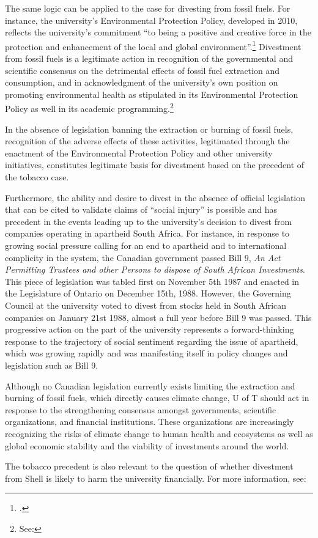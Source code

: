 The same logic can be applied to the case for divesting from fossil fuels. 
For instance, the university's Environmental Protection Policy, developed in 2010, reflects the university's commitment ``to being a positive and creative force in the protection and enhancement of the local and global environment''.\footcite[][]{UTEnvProtectionPolicy}
Divestment from fossil fuels is a legitimate action in recognition of the governmental and scientific consensus on the detrimental effects of fossil fuel extraction and consumption, and in acknowledgment of the university's own position on promoting environmental health as stipulated in its Environmental Protection Policy as well in its academic programming.\footnote{See: }



In the absence of legislation banning the extraction or burning of fossil fuels, recognition of the adverse effects of these activities, legitimated through the enactment of the Environmental Protection Policy and other university initiatives, constitutes legitimate basis for divestment based on the precedent of the tobacco case.  



Furthermore, the ability and desire to divest in the absence of official legislation that can be cited to validate claims of ``social injury'' is possible and has precedent in the events leading up to the university's decision to divest from companies operating in apartheid South Africa. 
For instance, in response to growing social pressure calling for an end to apartheid and to international complicity in the system, the Canadian government passed Bill 9, \emph{An Act Permitting Trustees and other Persons to dispose of South African Investments}.
This piece of legislation was tabled first on November 5th 1987 and enacted in the Legislature of Ontario on December 15th, 1988. 
However, the Governing Council at the university voted to divest from stocks held in South African companies on January 21st 1988, almost a full year before Bill 9 was passed. 
This progressive action on the part of the university represents a forward-thinking response to the trajectory of social sentiment regarding the issue of apartheid, which was growing rapidly and was manifesting itself in policy changes and legislation such as Bill 9. 



Although no Canadian legislation currently exists limiting the extraction and burning of fossil fuels, which directly causes climate change, U of T should act in response to the strengthening consensus amongst governments, scientific organizations, and financial institutions. These organizations are increasingly recognizing the risks of climate change to human health and ecosystems as well as global economic stability and the viability of investments around the world.



The tobacco precedent is also relevant to the question of whether divestment from Shell is likely to harm the university financially. For more information, see: 



